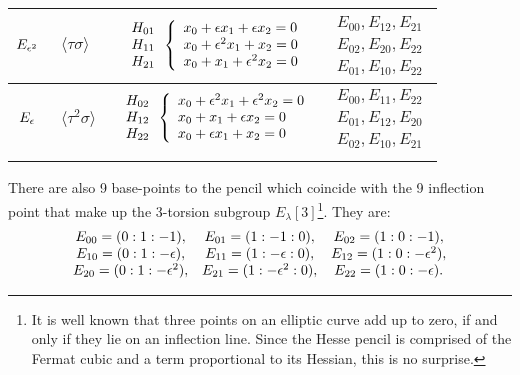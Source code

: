 \begin{table}[h!]
\begin{center}
\begin{tabular}{clcc}
			$E_{\epsilon^{2}}$&
			$\left.\begin{array}{l} \\ \langle\tau\sigma\rangle \\ \end{array}\right.$&
			$\begin{array}{l}H_{01}\\H_{11}\\H_{21} \end{array}\left\{\begin{array}{l}x_0+\epsilon x_1+\epsilon x_2=0\\x_0+\epsilon^{2}x_1+x_2=0\\x_0+x_1+\epsilon^{2}x_2=0\end{array}\right.$&$\begin{array}{l}E_{00},E_{12},E_{21}\\E_{02},E_{20},E_{22}\\E_{01},E_{10},E_{22} \end{array}$  \\\hline
			$E_{\epsilon}$&
			$\left.\begin{array}{l} \\ \langle\tau^{2}\sigma\rangle \\ \end{array}\right.$&
			$\begin{array}{l}H_{02}\\H_{12}\\H_{22} \end{array}\left\{\begin{array}{l}x_0+\epsilon^{2}x_1+\epsilon^{2}x_2=0\\x_0+x_1+\epsilon x_2=0\\x_0+\epsilon x_1+x_2=0\end{array}\right.$&$\begin{array}{l}E_{00},E_{11},E_{22}\\E_{01},E_{12},E_{20}\\E_{02},E_{10},E_{21} \end{array}$  \\
			\HLINE
		\end{tabular}
	\end{center}
\end{table}
There are also 9 base-points to the pencil which coincide with the 9 inflection point that make up the $3$-torsion subgroup $E_{\lambda}[3]$\footnote{It is well known that three points on an elliptic curve add up to zero, if and only if they lie on an inflection line. Since the Hesse pencil is comprised of the Fermat cubic and a term proportional to its Hessian, this is no surprise.}. They are:
\begin{eqnarray}
\begin{array}{ccc}
E_{00} = (0:1:-1),    & E_{01} = (1:-1:0),	  & E_{02} = (1:0:-1), \\
E_{10} = (0:1:-\epsilon),   & E_{11} = (1:-\epsilon:0),   & E_{12} = (1:0:-\epsilon^2),\\
E_{20} = (0:1:-\epsilon^2), & E_{21} = (1:-\epsilon^2:0), & E_{22} = (1:0:-\epsilon).
\end{array}
\end{eqnarray}


